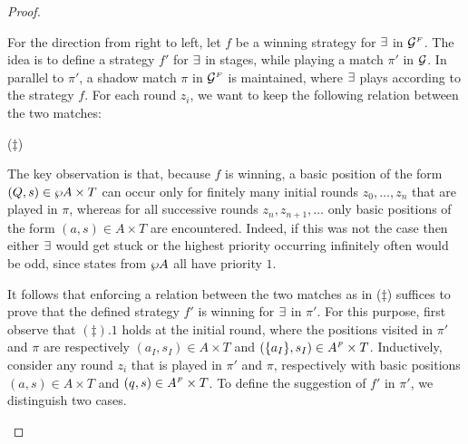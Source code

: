 \begin{proof}
\begin{enumerate}[(1)]
For the direction from right to left, let $f$ be a winning strategy for 
$\exists$ in $\mathcal{G}^{{\scriptscriptstyle F}}$.
The idea is to define a strategy $f'$ for $\exists$ in stages, while playing a
match $\pi'$ in $\mathcal{G}$. 
In parallel to $\pi'$, a shadow match $\pi$ in $\mathcal{G}^{{\scriptscriptstyle F}}$ is maintained, 
where $\exists$ plays according to the strategy $f$. 
For each round $z_i$, we want to keep the following relation between the two 
matches:
\smallskip
\begin{center}
\hspace*{0.3cm}($\ddag$)
\end{center}
\smallskip
The key observation is that, because $f$ is winning, a basic position of the 
form $(Q,s) \in \wp A \times T$ can occur only for finitely many initial rounds
$z_0,\dots,z_n$ that are played in $\pi$, whereas for all successive rounds 
$z_n,z_{n+1},\dots$ only basic positions of the form $(a,s) \in A \times T$ are
encountered. 
Indeed, if this was not the case then either $\exists$ would get stuck or the
highest priority occurring infinitely often would be odd, since states from 
$\wp A$ all have priority $1$.

It follows that enforcing a relation between the two matches as in ($\ddag$) suffices to prove that the defined strategy $f'$ is winning for $\exists$ in $\pi'$. For this purpose, first observe that $(\ddag).1$ holds at the initial round, where the positions visited in $\pi'$ and $\pi$ are respectively $(a_I,s_I) \in A \times T$ and $(\{a_I\},s_I) \in A^{{\scriptscriptstyle F}} \times T$. Inductively, consider any round $z_i$ that is played in $\pi'$ and $\pi$, respectively with basic positions $(a,s) \in A \times T$ and $(q,s) \in A^{{\scriptscriptstyle F}} \times T$. To define the suggestion of $f'$ in $\pi'$, we distinguish two cases.
\begin{itemize}


\end{itemize}
\end{enumerate}
\end{proof}
